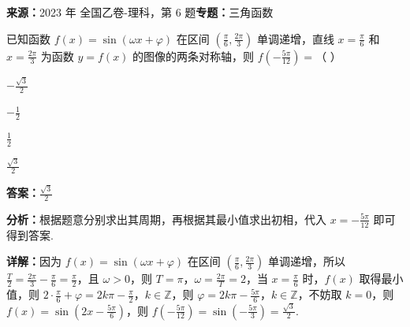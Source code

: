 \begin{question}[points=5]
\textbf{来源：}2023 年 全国乙卷-理科，第 6 题\quad \textbf{专题：}三角函数\par
已知函数 $f(x)=\sin(\omega x+\varphi)$ 在区间 $(\frac{\pi}{6},\frac{2\pi}{3})$ 单调递增，直线 $x=\frac{\pi}{6}$ 和 $x=\frac{2\pi}{3}$ 为函数 $y=f(x)$ 的图像的两条对称轴，则 $f(-\frac{5\pi}{12})=$（ ）
\begin{choices}
  \item $-\frac{\sqrt{3}}{2}$
  \item $-\frac{1}{2}$
  \item $\frac{1}{2}$
  \item $\frac{\sqrt{3}}{2}$
\end{choices}
\begin{solution}
\textbf{答案：}$\frac{\sqrt{3}}{2}$

\textbf{分析：}根据题意分别求出其周期，再根据其最小值求出初相，代入 $x=-\frac{5\pi}{12}$ 即可得到答案.

\textbf{详解：}因为 $f(x)=\sin(\omega x+\varphi)$ 在区间 $(\frac{\pi}{6},\frac{2\pi}{3})$ 单调递增，所以 $\frac{T}{2}=\frac{2\pi}{3}-\frac{\pi}{6}=\frac{\pi}{2}$，且 $\omega>0$，则 $T=\pi$，$\omega=\frac{2\pi}{T}=2$，当 $x=\frac{\pi}{6}$ 时，$f(x)$ 取得最小值，则 $2\cdot\frac{\pi}{6}+\varphi=2k\pi-\frac{\pi}{2}$，$k\in\mathbb{Z}$，则 $\varphi=2k\pi-\frac{5\pi}{6}$，$k\in\mathbb{Z}$，不妨取 $k=0$，则 $f(x)=\sin(2x-\frac{5\pi}{6})$，则 $f(-\frac{5\pi}{12})=\sin(-\frac{5\pi}{3})=\frac{\sqrt{3}}{2}$.
\end{solution}
\end{question}

